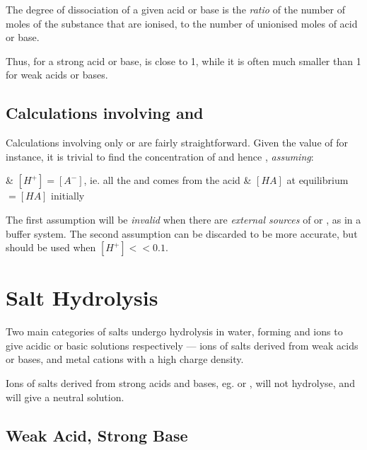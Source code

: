 			The degree of dissociation of a given acid or base is the \textit{ratio} of the number of moles of the substance that are ionised, to
			the number of unionised moles of acid or base.


			Thus, for a strong acid or base, \chemalpha is close to \num{1}, while it is often much smaller than \num{1} for weak acids or bases.



		\subsection{Calculations involving \MKa{} and \MKb{}}

			Calculations involving only \Ka{} or \Kb{} are fairly straightforward. Given the value of \Ka{} for instance, it is trivial
			to find the concentration of  and hence \pH{}, \textit{assuming}:

			\begin{bulletlist}
				& $[H^{+}] = [A^{-}]$, ie. all the  and  comes from the acid
				& $[HA]$ at equilibrium $ = [HA]$ initially
			\end{bulletlist}

			The first assumption will be \textit{invalid} when there are \textit{external sources} of  or , as in a buffer
			system. The second assumption can be discarded to be more accurate, but should be used when $[H^{+}] << 0.1$.



	\pagebreak
	\section{Salt Hydrolysis}

		Two main categories of salts undergo hydrolysis in water, forming  and  ions to give acidic or basic solutions
		respectively --- ions of salts derived from weak acids or bases, and metal cations with a high charge density.

		Ions of salts derived from strong acids and bases, eg.  or , will not hydrolyse, and will give a neutral solution.


		\subsection{Weak Acid, Strong Base}

